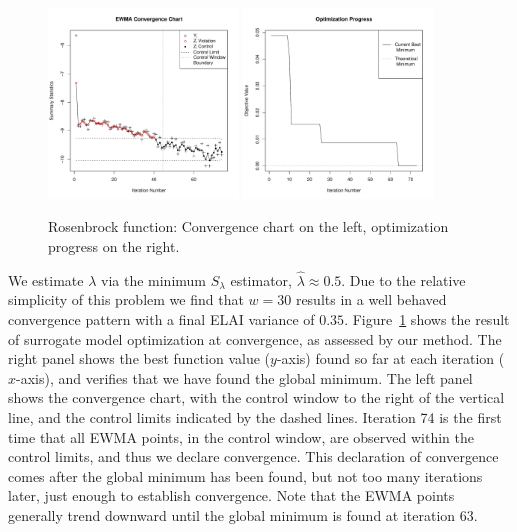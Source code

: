 \documentclass{article}
\begin{document}
%
\begin{figure}[htb]
  \includegraphics[width=0.45\textwidth]{./figures/ewmaConvChartRoseEasyEasyBW.pdf}
  \includegraphics[width=0.45\textwidth]{./figures/bestZRoseEasyEasyEnd.pdf}
  \caption{Rosenbrock function: Convergence chart on the left, optimization progress on the right.}
\label{fig:rosenbrock}
\end{figure}
We estimate $\lambda$ via the minimum $S_\lambda$ estimator, 
$\hat\lambda\approx 0.5$. Due to the relative simplicity of this problem 
we find that $w=30$ results in a well behaved convergence pattern with a final 
ELAI variance of $0.35$. Figure~\ref{fig:rosenbrock} shows the result of 
surrogate model optimization at convergence, as assessed by our method. The 
right panel shows the best function value \mbox{($y$-axis)} found so far at each 
iteration \mbox{($x$-axis),} and verifies that we have found the global minimum. The 
left panel shows the convergence chart, with the control window to the right 
of the vertical line, and the control limits indicated by the dashed 
lines. Iteration 74 is the first time that all EWMA points, in the control 
window, are observed within the control limits, and thus we declare 
convergence. This declaration of convergence comes after the global minimum 
has been found, but not too many iterations later, just enough to establish 
convergence. Note that the EWMA points generally trend downward until the 
global minimum is found at iteration 63.  
\end{document}
